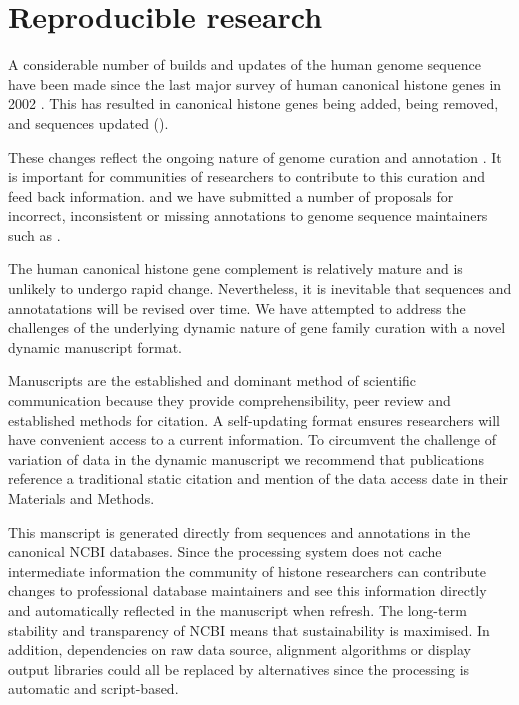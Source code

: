 \section{Reproducible research}
\label{sec:reproducible}

	A considerable number of builds and updates of the human genome sequence have been made 
	since the last major survey of human canonical histone genes in 2002 \citep{Marzluff02}.
	This has resulted in 
	 canonical histone genes being added, 
	 being removed, 
	and  sequences updated ().

	These changes reflect the ongoing nature of genome curation and annotation .
	It is important for communities of researchers 
	to contribute to this curation and feed back information. 
	and we have submitted a number of proposals 
	for incorrect, inconsistent or missing annotations
	to genome sequence maintainers
	such as . 

	The human canonical histone gene complement is relatively mature and is unlikely to undergo rapid change.
	Nevertheless, it is inevitable that sequences and annotatations will be revised over time.
	We have attempted to address the challenges of the underlying dynamic nature of 
	gene family curation with a novel dynamic manuscript format.

	Manuscripts are the established and dominant method of scientific communication
	because they provide comprehensibility, peer review and established methods for citation.
	A self-updating format ensures researchers will have convenient access to a current information.
	To circumvent the challenge of variation of data in the dynamic manuscript 
	we recommend that publications reference a traditional static citation 
	and mention of the data access date in their Materials and Methods.

	This manscript is generated directly from sequences and annotations in the canonical NCBI databases.
	Since the processing system does not cache intermediate information 
	the community of histone researchers can contribute changes to professional database maintainers 
	and see this information directly and automatically reflected in the manuscript when refresh.
	The long-term stability and transparency of NCBI means that sustainability is maximised.
	In addition, dependencies on raw data source, alignment algorithms or display output libraries
	could all be replaced by alternatives since the processing is automatic and script-based.

